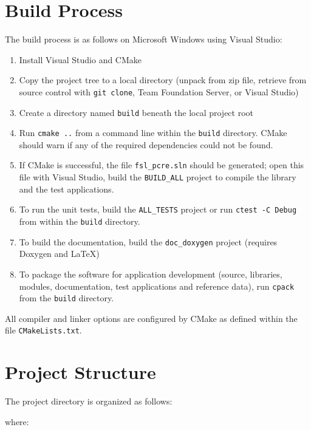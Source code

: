 \section{Build Process}
The build process is as follows on Microsoft Windows using Visual Studio:
\begin{enumerate}
\item Install Visual Studio and CMake
\item Copy the project tree to a local directory (unpack from zip file, retrieve from source control with \texttt{git clone}, Team Foundation Server, or Visual Studio)
\item Create a directory named \texttt{build} beneath the local project root
\item Run \texttt{cmake ..} from a command line within the \texttt{build} directory. CMake should warn if any of the required dependencies could not be found.
\item If CMake is successful, the file \texttt{fsl\_pcre.sln} should be generated; open this file with Visual Studio, build the \texttt{BUILD\_ALL} project to compile the library and the test applications.
\item To run the unit tests, build the \texttt{ALL\_TESTS} project or run \texttt{ctest -C Debug} from within the \texttt{build} directory.
\item To build the documentation, build the \texttt{doc\_doxygen} project (requires Doxygen and LaTeX)
\item To package the software for application development (source, libraries, modules, documentation, test applications and reference data), run \texttt{cpack} from the \texttt{build} directory.
\end{enumerate}

All compiler and linker options are configured by CMake as defined within the file \texttt{CMakeLists.txt}.

\section{Project Structure}
The project directory is organized as follows:


\clearpage

where:

